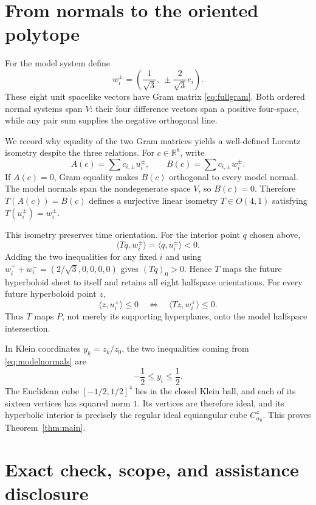 \documentclass[11pt]{article}
\begin{document}
\section{From normals to the oriented polytope}

For the model system define
\begin{equation}\label{eq:modelnormals}
 w_i^\pm=\left(\frac1{\sqrt3},\ \pm\frac2{\sqrt3}e_i\right).
\end{equation}
These eight unit spacelike vectors have Gram matrix
\eqref{eq:fullgram}.  Both ordered normal systems span $V$: their four
difference vectors span a positive four-space, while any pair sum
supplies the negative orthogonal line.

We record why equality of the two Gram matrices yields a well-defined
Lorentz isometry despite the three relations.  For $c\in\mathbb R^8$,
write
\[
 A(c)=\sum c_{i,\pm}u_i^\pm,
 \qquad B(c)=\sum c_{i,\pm}w_i^\pm.
\]
If $A(c)=0$, Gram equality makes $B(c)$ orthogonal to every model
normal.  The model normals span the nondegenerate space $V$, so
$B(c)=0$.  Therefore $T(A(c))=B(c)$ defines a surjective linear
isometry $T\in O(4,1)$ satisfying $T(u_i^\pm)=w_i^\pm$.

This isometry preserves time orientation.  For the interior point $q$
chosen above,
\[
 \langle Tq,w_i^\pm\rangle=\langle q,u_i^\pm\rangle<0.
\]
Adding the two inequalities for any fixed $i$ and using
$w_i^++w_i^-=(2/\sqrt3,0,0,0,0)$ gives $(Tq)_0>0$.  Hence $T$ maps the
future hyperboloid sheet to itself and retains all eight halfspace
orientations.  For every future hyperboloid point $z$,
\[
 \langle z,u_i^\pm\rangle\leq0
 \quad\Longleftrightarrow\quad
 \langle Tz,w_i^\pm\rangle\leq0.
\]
Thus $T$ maps $P$, not merely its supporting hyperplanes, onto the
model halfspace intersection.

In Klein coordinates $y_k=z_k/z_0$, the two inequalities coming from
\eqref{eq:modelnormals} are
\[
 -\frac12\leq y_i\leq\frac12.
\]
The Euclidean cube $[-1/2,1/2]^4$ lies in the closed Klein ball, and
each of its sixteen vertices has squared norm $1$.  Its vertices are
therefore ideal, and its hyperbolic interior is precisely the regular
ideal equiangular cube $C^4_{\alpha _0}$.  This proves
Theorem~\ref{thm:main}.

\section{Exact check, scope, and assistance disclosure}
\end{document}

